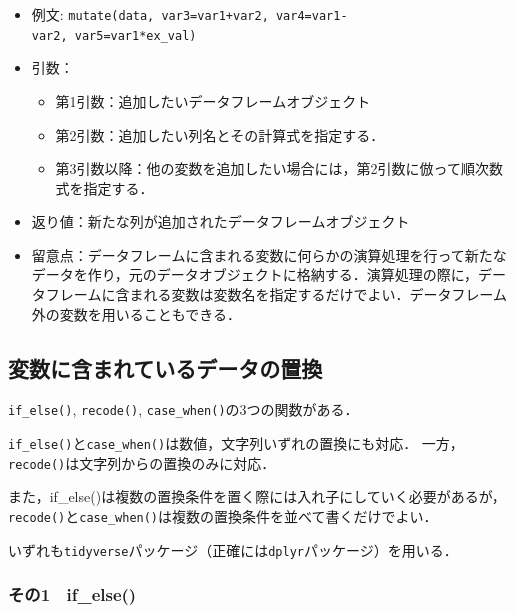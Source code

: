 \documentclass[
  xelatex, ja=standard]{bxjsarticle}
\providecommand{\tightlist}{%
  \setlength{\itemsep}{0pt}\setlength{\parskip}{0pt}}
\begin{document}
\begin{itemize}
\tightlist
\item
  例文:
  \texttt{mutate(data,\ var3=var1+var2,\ var4=var1-var2,\ var5=var1*ex\_val)}
\item
  引数：

  \begin{itemize}
  \tightlist
  \item
    第1引数：追加したいデータフレームオブジェクト
  \item
    第2引数：追加したい列名とその計算式を指定する．
  \item
    第3引数以降：他の変数を追加したい場合には，第2引数に倣って順次数式を指定する．
  \end{itemize}
\item
  返り値：新たな列が追加されたデータフレームオブジェクト
\item
  留意点：データフレームに含まれる変数に何らかの演算処理を行って新たなデータを作り，元のデータオブジェクトに格納する．演算処理の際に，データフレームに含まれる変数は変数名を指定するだけでよい．データフレーム外の変数を用いることもできる．
\end{itemize}

\subsection{変数に含まれているデータの置換}\label{ux5909ux6570ux306bux542bux307eux308cux3066ux3044ux308bux30c7ux30fcux30bfux306eux7f6eux63db}

\texttt{if\_else()}, \texttt{recode()},
\texttt{case\_when()}の3つの関数がある．

\texttt{if\_else()}と\texttt{case\_when()}は数値，文字列いずれの置換にも対応．
一方，\texttt{recode()}は文字列からの置換のみに対応．

また，if\_else()は複数の置換条件を置く際には入れ子にしていく必要があるが，\texttt{recode()}と\texttt{case\_when()}は複数の置換条件を並べて書くだけでよい．

いずれも\texttt{tidyverse}パッケージ（正確には\texttt{dplyr}パッケージ）を用いる．

\subsubsection{その1　if\_else()}\label{ux305dux306e1-if_else}
\end{document}
